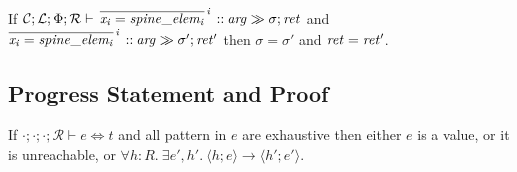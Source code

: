 \documentclass[11pt]{article}%
\newcommand{\ctxR}{\mathcal{R}}%
\newcommand{\stepsto}{\longrightarrow}%
\newcommand{\sych}{\Leftrightarrow}%
\newcommand{\hconf}[2]{\langle #1 ; #2 \rangle}%
\begin{document}
If $\mathcal{C}  ;  \mathcal{L}  ;  \Phi  ;  \mathcal{R}  \vdash \, \overline{\mathit{x_{\mathit{i}}}  =  \mathit{spine\_elem_{\mathit{i}}}}^{\,\mathit{i}} \, \mathbin{ {:} {:} }  \mathit{arg}  \gg  \sigma  ;  \mathit{ret}$ and
$\overline{\mathit{x_{\mathit{i}}}  =  \mathit{spine\_elem_{\mathit{i}}}}^{\,\mathit{i}} \, \mathbin{ {:} {:} }  \mathit{arg}  \gg  \sigma'  ;  \mathit{ret'}$ then $\sigma =
\sigma'$ and $\mathit{ret} = \mathit{ret'}$.


\subsection{Progress Statement and Proof}\label{subsec:progress}

If $\cdot ; \cdot ; \cdot ; \ctxR \vdash e \sych t$ and all pattern in $e$ are
exhaustive then either $e$ is a value, or it is unreachable, or $\forall h
: R.\ \exists e' , h' .\ \hconf{h}{e} \stepsto \hconf{h'}{e'}$.
\end{document}
